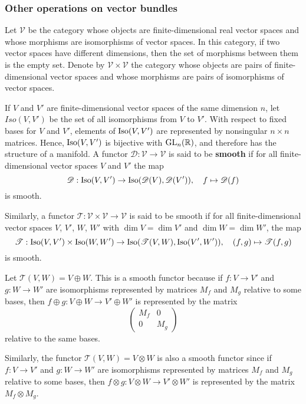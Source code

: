 \subsubsection{Other operations on vector bundles}
Let $\mathcal{V}$ be the category whose objects are finite-dimensional real vector spaces and whose morphisms are isomorphisms of vector spaces. In this category, if 
two vector spaces have different dimensions, then the set of morphisms between them is the empty set. Denote by $\mathcal{V}\times\mathcal{V}$ the category whose 
objects are pairs of finite-dimensional vector spaces and whose morphisms are pairs of isomorphisms of vector spaces.\par
If $V$ and $V'$ are finite-dimensional vector spaces of the same dimension $n$, let $Iso(V,V')$ be the set of all isomorphisms from $V$ to $V'$. With respect to fixed 
bases for $V$ and $V'$, elements of $\mathrm{Iso}(V,V')$ are represented by nonsingular $n\times n$ matrices. Hence, $\mathrm{Iso}(V,V')$ is bijective with $\mathrm{GL}_n(\mathbb{R})$, and therefore 
has the structure of a manifold. A functor $\mathscr{D}:\mathcal{V}\to\mathcal{V}$ is said to be \textbf{smooth} if for all finite-dimensional vector spaces $V$ and $V'$ the map
\[\mathscr{D}:\mathrm{Iso}(V,V')\to\mathrm{Iso}(\mathscr{D}(V),\mathscr{D}(V')),\quad f\mapsto\mathscr{D}(f)\]
is smooth.\par
Similarly, a functor $\mathscr{T}:\mathcal{V}\times\mathcal{V}\to\mathcal{V}$ is said to be smooth if for all finite-dimensional vector spaces
$V$, $V'$, $W$, $W'$ with $\dim V=\dim V'$ and $\dim W=\dim W'$, the map
\[\mathscr{T}:\mathrm{Iso}(V,V')\times\mathrm{Iso}(W,W')\to\mathrm{Iso}(\mathscr{T}(V,W),\mathrm{Iso}(V',W')),\quad (f,g)\mapsto\mathscr{T}(f,g)\]
is smooth.
\begin{example}
Let $\mathscr{T}(V,W)=V\oplus W$. This is a smooth functor because if $f:V\to V'$ and $g:W\to W'$ are isomorphisms represented by matrices $M_f$ and $M_g$ relative to 
some bases, then $f\oplus g:V\oplus W\to V'\oplus W'$ is represented by the matrix
\[\begin{pmatrix}
M_f&0\\
0&M_g
\end{pmatrix}\]
relative to the same bases.
\end{example}
\begin{example}
Similarly, the functor $\mathscr{T}(V,W)=V\otimes W$ is also a smooth functor since if $f:V\to V'$ and $g:W\to W'$ are isomorphisms represented by matrices $M_f$ and $M_g$ 
relative to some bases, then $f\otimes g:V\otimes W\to V'\otimes W'$ is represented by the matrix $M_f\otimes M_g$.
\end{example}
